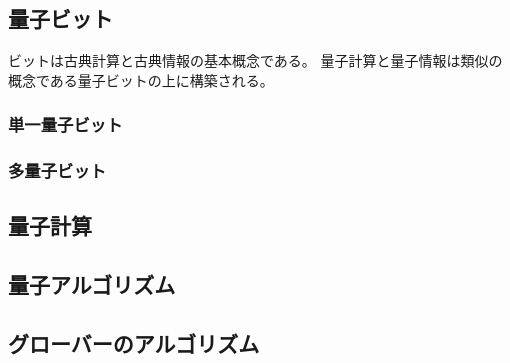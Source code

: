 \begin{comment}
    基本的内容
\end{comment}


\subsection{量子ビット}
ビットは古典計算と古典情報の基本概念である。
量子計算と量子情報は類似の概念である量子ビットの上に構築される。
\subsubsection{単一量子ビット}
% 


\subsubsection{多量子ビット}
% 


\subsection{量子計算}
% 


\subsection{量子アルゴリズム}


\subsection{グローバーのアルゴリズム}
